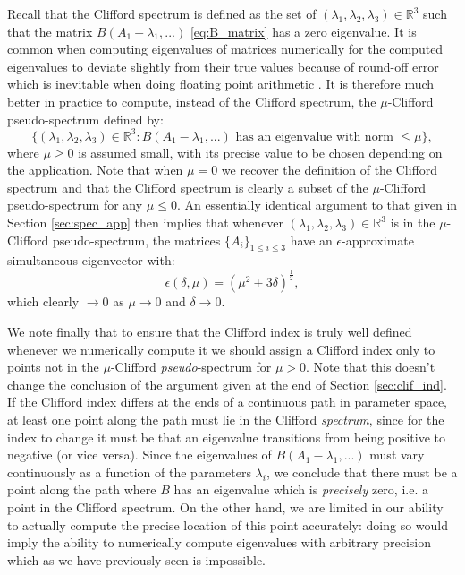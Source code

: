 \documentclass[a4paper]{article}
\begin{document}
Recall that the Clifford spectrum is defined as the set of $(\lambda_1,\lambda_2,\lambda_3) \in \mathbb{R}^3$ such that the matrix $B(A_1 - \lambda_1,...)$ \eqref{eq:B_matrix} has a zero eigenvalue. It is common when computing eigenvalues of matrices numerically for the computed eigenvalues to deviate slightly from their true values because of round-off error which is inevitable when doing floating point arithmetic \cite{need ref}. It is therefore much better in practice to compute, instead of the Clifford spectrum, the {$\mu$-Clifford pseudo-spectrum} defined by: 
\begin{equation}
	\{ (\lambda_1, \lambda_2, \lambda_3) \in \mathbb{R}^3 : B(A_1 - \lambda_1,...) \text{ has an eigenvalue with norm $\leq \mu$} \},
\end{equation}
where $\mu \geq 0$ is assumed small, with its precise value to be chosen depending on the application. Note that when $\mu = 0$ we recover the definition of the Clifford spectrum and that the Clifford spectrum is clearly a subset of the $\mu$-Clifford pseudo-spectrum for any $\mu \leq 0$. An essentially identical argument to that given in Section \ref{sec:spec_app} then implies that whenever $(\lambda_1, \lambda_2, \lambda_3) \in \mathbb{R}^3$ is in the $\mu$-Clifford pseudo-spectrum, the matrices $\{ A_i \}_{1 \leq i \leq 3}$ have an $\epsilon$-approximate simultaneous eigenvector with:
\begin{equation}
	\epsilon(\delta,\mu) = \left( \mu^2 + 3 \delta \right)^{\frac{1}{2}},
\end{equation}
which clearly $\rightarrow 0$ as $\mu \rightarrow 0$ and $\delta \rightarrow 0$. 

We note finally that to ensure that the Clifford index is truly well defined whenever we numerically compute it we should assign a Clifford index only to points not in the $\mu$-Clifford \emph{pseudo}-spectrum for $\mu > 0$. Note that this doesn't change the conclusion of the argument given at the end of Section \ref{sec:clif_ind}. If the Clifford index differs at the ends of a continuous path in parameter space, at least one point along the path must lie in the Clifford \emph{spectrum}, since for the index to change it must be that an eigenvalue transitions from being positive to negative (or vice versa). Since the eigenvalues of $B(A_1 - \lambda_1,...)$ must vary continuously as a function of the parameters $\lambda_i$, we conclude that there must be a point along the path where $B$ has an eigenvalue which is \emph{precisely} zero, i.e. a point in the Clifford spectrum. On the other hand, we are limited in our ability to actually compute the precise location of this point accurately: doing so would imply the ability to numerically compute eigenvalues with arbitrary precision which as we have previously seen is impossible. 
\end{document}
